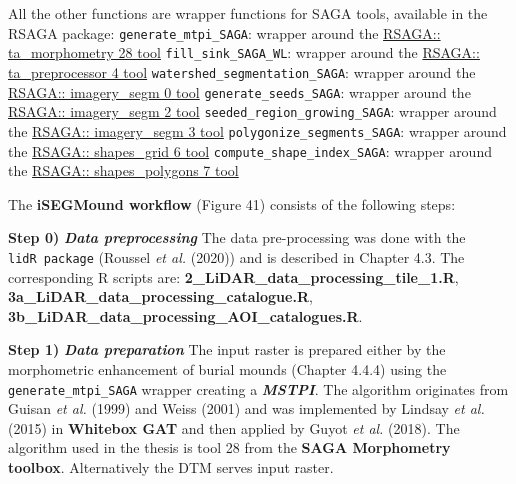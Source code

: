 \documentclass[
  12pt,
]{article}
\begin{document}
All the other functions are wrapper functions for SAGA tools, available in the RSAGA package:
\newline
\texttt{generate\_mtpi\_SAGA}: wrapper around the \href{http://www.saga-gis.org/saga_tool_doc/7.9.1/ta_morphometry_28.html}{RSAGA:: ta\_morphometry 28 tool}
\newline
\texttt{fill\_sink\_SAGA\_WL}: wrapper around the \href{http://www.saga-gis.org/saga_tool_doc/7.9.1/ta_preprocessor_4.html}{RSAGA:: ta\_preprocessor 4 tool}
\newline
\texttt{watershed\_segmentation\_SAGA}: wrapper around the \href{http://www.saga-gis.org/saga_tool_doc/7.9.1/imagery_segmentation_0.html}{RSAGA:: imagery\_segm 0 tool}
\newline
\texttt{generate\_seeds\_SAGA}: wrapper around the \href{http://www.saga-gis.org/saga_tool_doc/7.9.1/imagery_segmentation_2.html}{RSAGA:: imagery\_segm 2 tool}
\newline
\texttt{seeded\_region\_growing\_SAGA}: wrapper around the \href{http://www.saga-gis.org/saga_tool_doc/7.9.1/imagery_segmentation_3.html}{RSAGA:: imagery\_segm 3 tool}
\newline
\texttt{polygonize\_segments\_SAGA}: wrapper around the \href{http://www.saga-gis.org/saga_tool_doc/7.9.1/shapes_grid_6.html}{RSAGA:: shapes\_grid 6 tool}
\newline
\texttt{compute\_shape\_index\_SAGA}: wrapper around the \href{http://www.saga-gis.org/saga_tool_doc/7.9.1/shapes_polygons_7.html}{RSAGA:: shapes\_polygons 7 tool}

The \textbf{iSEGMound workflow} (Figure 41) consists of the following steps:

\textbf{Step 0)} \textbf{\emph{Data preprocessing}}
\newline
The data pre-processing was done with the \texttt{lidR\ package} (Roussel \emph{et al.} (2020)) and is described in Chapter 4.3. The corresponding R scripts are: \textbf{2\_LiDAR\_data\_processing\_tile\_1.R}, \textbf{3a\_LiDAR\_data\_processing\_catalogue.R}, \textbf{3b\_LiDAR\_data\_processing\_AOI\_catalogues.R}.

\textbf{Step 1)} \textbf{\emph{Data preparation}}
\newline
The input raster is prepared either by the morphometric enhancement of burial mounds (Chapter 4.4.4) using the \texttt{generate\_mtpi\_SAGA} wrapper creating a \textbf{\emph{MSTPI}}. The algorithm originates from Guisan \emph{et al.} (1999) and Weiss (2001) and was implemented by Lindsay \emph{et al.} (2015) in \textbf{Whitebox GAT} and then applied by Guyot \emph{et al.} (2018). The algorithm used in the thesis is tool 28 from the \textbf{SAGA Morphometry toolbox}. Alternatively the DTM serves input raster.
\end{document}
